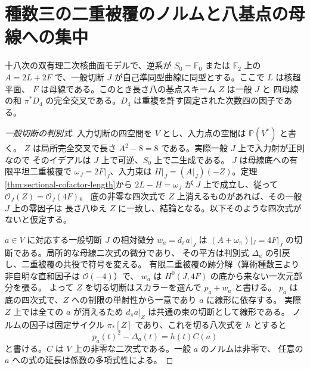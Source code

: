 \section{種数三の二重被覆のノルムと八基点の母線への集中}
\label{sec:sectional-hyperelliptic-norm}
\begin{theorem}\label{thm:sectional-hyperelliptic-norm}
十八次の双有理二次核曲面モデルで、逆系が $S_0=\mathbb F_0$ または $\mathbb F_2$ 上の
$A=2L+2F$ で、一般切断 $J$ が自己準同型曲線に同型とする。ここで $L$ は核超平面、
$F$ は母線である。このとき長さ八の基点スキーム $Z$ は一般 $J$ と
四母線の和 $\pi^*D_4$ の完全交叉である。$D_4$ は重複を許す固定された次数四の因子である。
\end{theorem}
\begin{proof}[一般切断の判別式]
入力切断の四空間を $V$ とし、入力点の空間は $\mathbb P(V^*)$ と書く。
$Z$ は局所完全交叉で長さ $A^2-8=8$ である。実際一般 $J$ 上で入力射が正則なので
そのイデアルは $J$ 上で可逆、$S_0$ 上で二生成である。
$J$ は母線底への有限平坦二重被覆で $\omega_J=2F|_J$、入力束は
$H|_J=(A|_J)(-Z)$。定理\ref{thm:sectional-cofactor-length}から $2L-H=\omega_J$ が
$J$ 上で成立し、従って $\mathcal O_J(Z)=\mathcal O_J(4F)$。
底の非零な四次式で $Z$ 上消えるものがあれば、その一般 $J$ 上の零因子は
長さ八ゆえ $Z$ に一致し、結論となる。以下そのような四次式がないと仮定する。

$a\in V$ に対応する一般切断 $J$ の相対微分 $w_a=d_{\pi}a|_J$ は
$(A+\omega_\pi)|_J=4F|_J$ の切断である。局所的な母線二次式の微分であり、
その平方は判別式 $\Delta_a$ の引戻し、二重被覆の共役で符号を変える。
有限二重被覆の跡分解（算術種数三より非自明な直和因子は $\mathcal O(-4)$）で、
$w_a$ は $H^0(J,4F)$ の底から来ない一次元部分を張る。
よって $Z$ を切る切断はスカラーを選んで $p_a+w_a$ と書ける。
$p_a$ は底の四次式で、$Z$ への制限の単射性から一意であり $a$ に線形に依存する。
実際 $Z$ 上では全ての $a$ が消えるため $d_\pi a|_Z$ は共通の束の切断として線形である。
ノルムの因子は固定サイクル $\pi_*[Z]$ であり、これを切る八次式を $h$ とすると
\[
           p_a(t)^2-\Delta_a(t)=h(t) C(a)
\]
と書ける。$C$ は $V$ 上の非零な二次式である。一般 $a$ のノルムは非零で、
任意の $a$ への式の延長は係数の多項式性による。


\end{proof}
